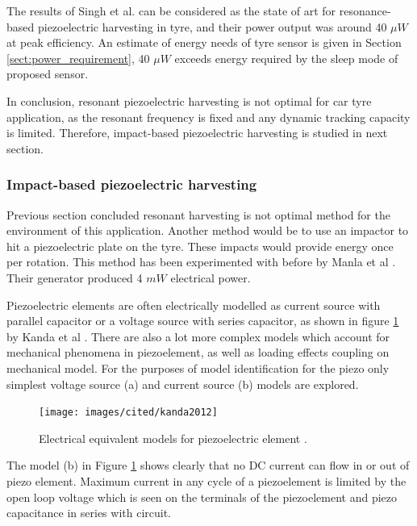 The results of Singh et al. can be considered as the state of art for resonance-based piezoelectric harvesting in tyre, and their power output was around 40 $\mu W$ at peak efficiency. An estimate of energy needs of tyre sensor is given in Section \ref{sect:power_requirement}, 40 $\mu W$ exceeds energy required by the sleep mode of proposed sensor.

In conclusion, resonant piezoelectric harvesting is not optimal for car tyre application, as the resonant frequency is fixed and any dynamic tracking capacity is limited. Therefore, impact-based piezoelectric harvesting is studied in next section.

\subsubsection{Impact-based piezoelectric harvesting}
Previous section concluded resonant harvesting is not optimal method for the environment of this application. Another method would be to use an impactor to hit a piezoelectric plate on the tyre. These impacts would provide energy once per rotation. This method has been experimented with before by Manla et al \cite{Manla2009}. Their generator produced 4 $mW$ electrical power.

Piezoelectric elements are often electrically modelled as current source with parallel capacitor or a voltage source with series capacitor, as shown in figure \ref{fig:piezo_equivalents} by Kanda et al \cite{Kanda2012}. There are also a lot more complex models which account for mechanical phenomena in piezoelement, as well as loading effects coupling on mechanical model. For the purposes of model identification for the piezo only simplest voltage source (a) and current source (b) models are explored.

\begin{figure}[htb]
  \begin{center}
  \texttt{[image: images/cited/kanda2012]}
  \end{center}
  \caption{Electrical equivalent models for piezoelectric element \cite{Kanda2012}.}
  \label{fig:piezo_equivalents}
\end{figure}

The model (b) in Figure \ref{fig:piezo_equivalents} shows clearly that no DC current can flow in or out of piezo element. Maximum current in any cycle of a piezoelement is limited by the open loop voltage which is seen on the terminals of the piezoelement and piezo capacitance in series with circuit. 

